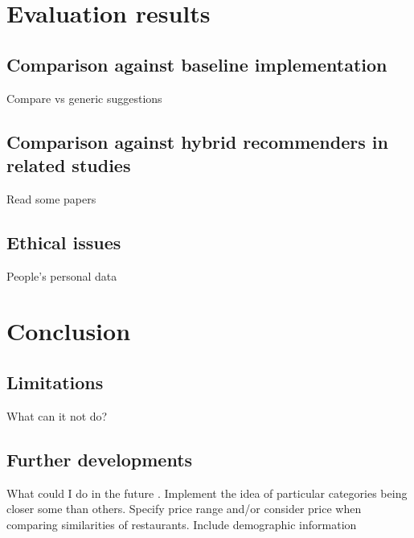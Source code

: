 \documentclass[conference]{IEEEtran}
\begin{document}
\section{Evaluation results}

\subsection{Comparison against baseline implementation}
Compare vs generic suggestions

\subsection{Comparison against hybrid recommenders in related studies}
Read some papers

\subsection{Ethical issues}
People's personal data


\section{Conclusion}

\subsection{Limitations}
What can it not do?

\subsection{Further developments}
What could I do in the future \cite{5284958}. 
Implement the idea of particular categories being closer some than others. 
Specify price range and/or consider price when comparing similarities of restaurants. 
Include demographic information




\end{document}
